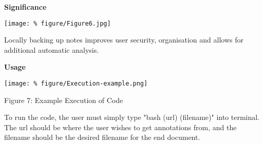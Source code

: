 \documentclass[unknownkeysallowed,usepdftitle=false, parskip=full]{beamer}
\newcommand{\secvariable}{nothing}
\newcommand{\mysection}[1]{\renewcommand{\secvariable}{#1}
}
\begin{document}
\mysection{major}
\begin{frame}\label{\secvariable} %
\parbox{\linewidth}{\textbf{Significance}}
\begin{center}
\texttt{[image: \%
figure/Figure6.jpg]}
\end{center}

    \parbox{\linewidth}{

Locally backing up notes improves user security, organisation and allows for additional automatic analysis.
}
\end{frame}

\mysection{slab}
\begin{frame}\label{\secvariable}
\begin{center}
 \parbox{\linewidth}{ \textbf{Usage}}
   \vspace{12pt}
   
\texttt{[image: \%
figure/Execution-example.png]}
\end{center}
    \parbox{\linewidth}{
    Figure 7: Example Execution of Code
    
  \vspace{12pt}  

To run the code, the user must simply type "bash (url) (filename)" into terminal. The url should be where the user wishes to get annotations from, and the filename should be the desired filename for the end document. \hyperlink{slabtable}{}
}

\end{frame}
\end{document}
